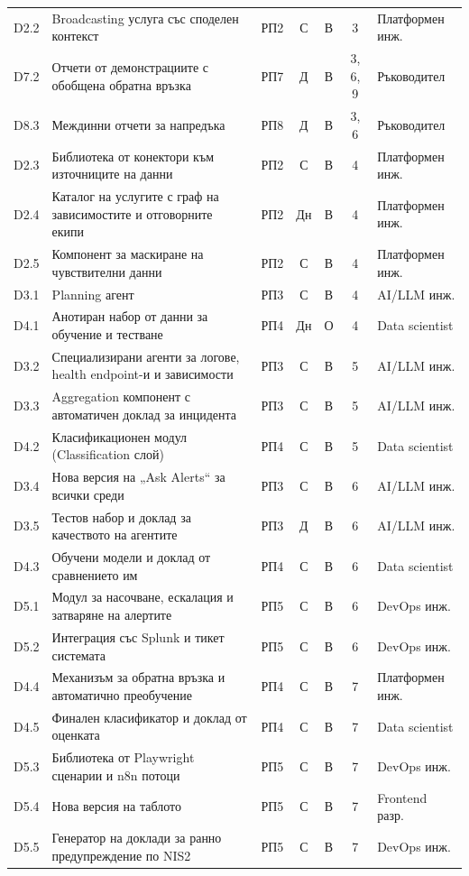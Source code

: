 \documentclass[11pt,a4paper]{article}
\begin{document}
{\begin{xltabular}{\textwidth}{@{}l X l c c c l@{}}
D2.2 & Broadcasting услуга със споделен контекст & РП2 & С & В & 3 & Платформен инж.\\
D7.2 & Отчети от демонстрациите с обобщена обратна връзка & РП7 & Д & В & 3, 6, 9 & Ръководител\\
D8.3 & Междинни отчети за напредъка & РП8 & Д & В & 3, 6 & Ръководител\\
D2.3 & Библиотека от конектори към източниците на данни & РП2 & С & В & 4 & Платформен инж.\\
D2.4 & Каталог на услугите с граф на зависимостите и отговорните екипи & РП2 & Дн & В & 4 & Платформен инж.\\
D2.5 & Компонент за маскиране на чувствителни данни & РП2 & С & В & 4 & Платформен инж.\\
D3.1 & Planning агент & РП3 & С & В & 4 & AI/LLM инж.\\
D4.1 & Анотиран набор от данни за обучение и тестване & РП4 & Дн & О & 4 & Data scientist\\
D3.2 & Специализирани агенти за логове, health endpoint-и и зависимости & РП3 & С & В & 5 & AI/LLM инж.\\
D3.3 & Aggregation компонент с автоматичен доклад за инцидента & РП3 & С & В & 5 & AI/LLM инж.\\
D4.2 & Класификационен модул (Classification слой) & РП4 & С & В & 5 & Data scientist\\
D3.4 & Нова версия на „Ask Alerts“ за всички среди & РП3 & С & В & 6 & AI/LLM инж.\\
D3.5 & Тестов набор и доклад за качеството на агентите & РП3 & Д & В & 6 & AI/LLM инж.\\
D4.3 & Обучени модели и доклад от сравнението им & РП4 & С & В & 6 & Data scientist\\
D5.1 & Модул за насочване, ескалация и затваряне на алертите & РП5 & С & В & 6 & DevOps инж.\\
D5.2 & Интеграция със Splunk и тикет системата & РП5 & С & В & 6 & DevOps инж.\\
D4.4 & Механизъм за обратна връзка и автоматично преобучение & РП4 & С & В & 7 & Платформен инж.\\
D4.5 & Финален класификатор и доклад от оценката & РП4 & С & В & 7 & Data scientist\\
D5.3 & Библиотека от Playwright сценарии и n8n потоци & РП5 & С & В & 7 & DevOps инж.\\
D5.4 & Нова версия на таблото & РП5 & С & В & 7 & Frontend разр.\\
D5.5 & Генератор на доклади за ранно предупреждение по NIS2 & РП5 & С & В & 7 & DevOps инж.\\

\end{xltabular}}
\end{document}
